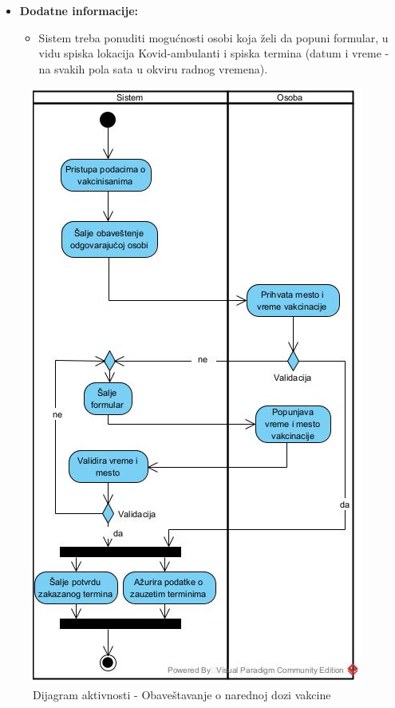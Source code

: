 \documentclass[titlepage]{article}
\begin{document}
\begin{itemize}
\begin{itemize}
    \end{itemize}
    \item \textbf{Dodatne informacije:}
    \begin{itemize}
        \item Sistem treba ponuditi mogućnosti osobi koja želi da popuni formular, u vidu spiska lokacija Kovid-ambulanti i spiska termina (datum i vreme - na svakih pola sata u okviru radnog vremena).
    \end{itemize}
\end{itemize}


\begin{figure}[H]
\centering
\includegraphics[scale=0.8]{Vakcinacija_drugom_dozom}
\caption{Dijagram aktivnosti - Obaveštavanje o narednoj dozi vakcine}
\end{figure}
\end{document}
